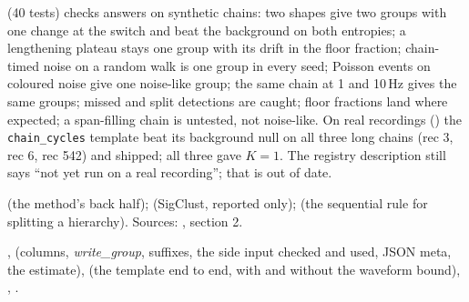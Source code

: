  (40 tests) checks answers on synthetic chains: two shapes
give two groups with one change at the switch and beat the background on both entropies; a
lengthening plateau stays one group with its drift in the floor fraction; chain-timed noise on
a random walk is one group in every seed; Poisson events on coloured noise give one
noise-like group; the same chain at 1 and 10\,Hz gives the same groups; missed and split
detections are caught; floor fractions land where expected; a span-filling chain is
untested, not noise-like. On real recordings ()
the \texttt{chain\_cycles} template beat its background null on all three long chains
(rec 3, rec 6, rec 542) and shipped; all three gave $K = 1$. The registry description still
says ``not yet run on a real recording''; that is out of date.

\citet{colominas2023iterative} (the method's back half); \citet{liu2008statistical}
(SigClust, reported only); \citet{kimes2017statistical} (the sequential rule for splitting a
hierarchy). Sources: , section 2.

,  (columns,
\emph{write\_group}, suffixes, the side input checked and used, JSON meta, the estimate),
 (the template end to end, with and without the
waveform bound), , .

